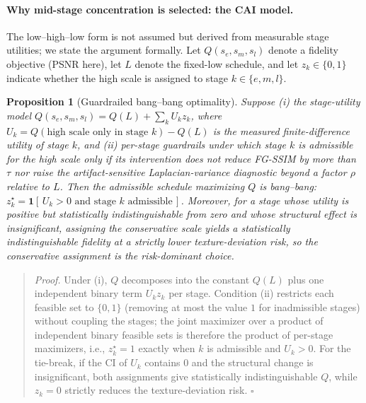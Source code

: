 \documentclass[times,twocolumn,final]{elsarticle}
\newtheorem{proposition}{Proposition} %
\providecommand{\DIFadd}[1]{{\protect\color{red} \sf #1}} %
\providecommand{\DIFaddbegin}{} %
\newcommand{\DIFaddincludegraphics}[2][]{{\color{red}\fbox{\DIFOincludegraphics[#1]{#2}}}} %
\DeclareRobustCommand{\DIFaddbegin}{\DIFOaddbegin \let\includegraphics\DIFaddincludegraphics} %
\begin{document}
\DIFaddbegin \paragraph{\DIFadd{Why mid-stage concentration is selected: the CAI model.}}
\DIFadd{The low--high--low form is not assumed but derived from measurable stage utilities; we state the argument formally. Let $Q(s_e,s_m,s_l)$ denote a fidelity objective (PSNR here), let $L$ denote the fixed-low schedule, and let $z_k\in\{0,1\}$ indicate whether the high scale is assigned to stage $k\in\{e,m,l\}$.
}

\begin{proposition}[Guardrailed bang--bang optimality]
\label{prop:cai}
\DIFadd{Suppose (i) the stage-utility model $Q(s_e,s_m,s_l)=Q(L)+\sum_{k}U_k z_k$, where $U_k=Q(\text{high scale only in stage }k)-Q(L)$ is the measured finite-difference utility of stage $k$, and (ii) per-stage guardrails under which stage $k$ is admissible for the high scale only if its intervention does not reduce FG-SSIM by more than $\tau$ nor raise the artifact-sensitive Laplacian-variance diagnostic beyond a factor $\rho$ relative to $L$. Then the admissible schedule maximizing $Q$ is bang--bang: $z_k^{\star}=\mathbf{1}[\,U_k>0 \text{ and stage } k \text{ admissible}\,]$. Moreover, for a stage whose utility is positive but statistically indistinguishable from zero and whose structural effect is insignificant, assigning the conservative scale yields a statistically indistinguishable fidelity at a strictly lower texture-deviation risk, so the conservative assignment is the risk-dominant choice.
}\end{proposition}

\begin{quote}\small
\DIFadd{\textit{Proof.} Under (i), $Q$ decomposes into the constant $Q(L)$ plus one independent binary term $U_k z_k$ per stage. Condition (ii) restricts each feasible set to $\{0,1\}$ (removing at most the value $1$ for inadmissible stages) without coupling the stages; the joint maximizer over a product of independent binary feasible sets is therefore the product of per-stage maximizers, i.e., $z_k^{\star}=1$ exactly when $k$ is admissible and $U_k>0$. For the tie-break, if the CI of $U_k$ contains $0$ and the structural change is insignificant, both assignments give statistically indistinguishable $Q$, while $z_k=0$ strictly reduces the texture-deviation risk. }\hfill\DIFadd{$\square$
}\end{quote}
\end{document}
